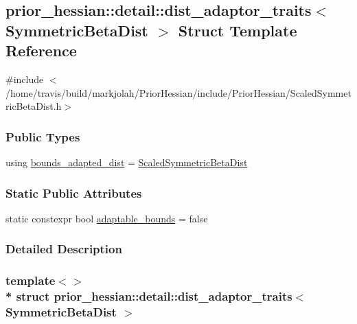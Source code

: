\hypertarget{structprior__hessian_1_1detail_1_1dist__adaptor__traits_3_01SymmetricBetaDist_01_4}{}\subsection{prior\+\_\+hessian\+:\+:detail\+:\+:dist\+\_\+adaptor\+\_\+traits$<$ Symmetric\+Beta\+Dist $>$ Struct Template Reference}
\label{structprior__hessian_1_1detail_1_1dist__adaptor__traits_3_01SymmetricBetaDist_01_4}


{\ttfamily \#include $<$/home/travis/build/markjolah/\+Prior\+Hessian/include/\+Prior\+Hessian/\+Scaled\+Symmetric\+Beta\+Dist.\+h$>$}

\subsubsection*{Public Types}
\begin{DoxyCompactItemize}
\item 
using \hyperlink{structprior__hessian_1_1detail_1_1dist__adaptor__traits_3_01SymmetricBetaDist_01_4_a64a7abf2a59990f45dcd32d226016bf3}{bounds\+\_\+adapted\+\_\+dist} = \hyperlink{namespaceprior__hessian_ae84776b8f8ed86c14a5ce47a29b7a1be}{Scaled\+Symmetric\+Beta\+Dist}
\end{DoxyCompactItemize}
\subsubsection*{Static Public Attributes}
\begin{DoxyCompactItemize}
\item 
static constexpr bool \hyperlink{structprior__hessian_1_1detail_1_1dist__adaptor__traits_3_01SymmetricBetaDist_01_4_ac1f8cdd947f6ea1503cd3deca19178ad}{adaptable\+\_\+bounds} = false
\end{DoxyCompactItemize}


\subsubsection{Detailed Description}
\subsubsection*{template$<$$>$\\*
struct prior\+\_\+hessian\+::detail\+::dist\+\_\+adaptor\+\_\+traits$<$ Symmetric\+Beta\+Dist $>$}



